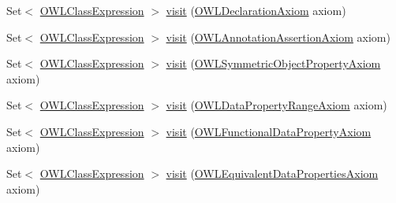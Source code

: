 \begin{DoxyCompactItemize}
\item 
Set$<$ \hyperlink{interfaceorg_1_1semanticweb_1_1owlapi_1_1model_1_1_o_w_l_class_expression}{O\-W\-L\-Class\-Expression} $>$ \hyperlink{classorg_1_1semanticweb_1_1owlapi_1_1util_1_1_o_w_l_class_expression_collector_a4c22701dd72424f43bfbb8e24f73ffbc}{visit} (\hyperlink{interfaceorg_1_1semanticweb_1_1owlapi_1_1model_1_1_o_w_l_declaration_axiom}{O\-W\-L\-Declaration\-Axiom} axiom)
\item 
Set$<$ \hyperlink{interfaceorg_1_1semanticweb_1_1owlapi_1_1model_1_1_o_w_l_class_expression}{O\-W\-L\-Class\-Expression} $>$ \hyperlink{classorg_1_1semanticweb_1_1owlapi_1_1util_1_1_o_w_l_class_expression_collector_ac33f92cc059156d0fce166945c9eac7b}{visit} (\hyperlink{interfaceorg_1_1semanticweb_1_1owlapi_1_1model_1_1_o_w_l_annotation_assertion_axiom}{O\-W\-L\-Annotation\-Assertion\-Axiom} axiom)
\item 
Set$<$ \hyperlink{interfaceorg_1_1semanticweb_1_1owlapi_1_1model_1_1_o_w_l_class_expression}{O\-W\-L\-Class\-Expression} $>$ \hyperlink{classorg_1_1semanticweb_1_1owlapi_1_1util_1_1_o_w_l_class_expression_collector_aaa946c7584921ec4dc6ffac67aa0a34b}{visit} (\hyperlink{interfaceorg_1_1semanticweb_1_1owlapi_1_1model_1_1_o_w_l_symmetric_object_property_axiom}{O\-W\-L\-Symmetric\-Object\-Property\-Axiom} axiom)
\item 
Set$<$ \hyperlink{interfaceorg_1_1semanticweb_1_1owlapi_1_1model_1_1_o_w_l_class_expression}{O\-W\-L\-Class\-Expression} $>$ \hyperlink{classorg_1_1semanticweb_1_1owlapi_1_1util_1_1_o_w_l_class_expression_collector_a5d4dba8d5e204c59fb98103a145485a9}{visit} (\hyperlink{interfaceorg_1_1semanticweb_1_1owlapi_1_1model_1_1_o_w_l_data_property_range_axiom}{O\-W\-L\-Data\-Property\-Range\-Axiom} axiom)
\item 
Set$<$ \hyperlink{interfaceorg_1_1semanticweb_1_1owlapi_1_1model_1_1_o_w_l_class_expression}{O\-W\-L\-Class\-Expression} $>$ \hyperlink{classorg_1_1semanticweb_1_1owlapi_1_1util_1_1_o_w_l_class_expression_collector_ae5b21f2bf5cd351fde6f3b450986162a}{visit} (\hyperlink{interfaceorg_1_1semanticweb_1_1owlapi_1_1model_1_1_o_w_l_functional_data_property_axiom}{O\-W\-L\-Functional\-Data\-Property\-Axiom} axiom)
\item 
Set$<$ \hyperlink{interfaceorg_1_1semanticweb_1_1owlapi_1_1model_1_1_o_w_l_class_expression}{O\-W\-L\-Class\-Expression} $>$ \hyperlink{classorg_1_1semanticweb_1_1owlapi_1_1util_1_1_o_w_l_class_expression_collector_af2d97e36d3ec4271de30981a17d5a358}{visit} (\hyperlink{interfaceorg_1_1semanticweb_1_1owlapi_1_1model_1_1_o_w_l_equivalent_data_properties_axiom}{O\-W\-L\-Equivalent\-Data\-Properties\-Axiom} axiom)

\end{DoxyCompactItemize}
